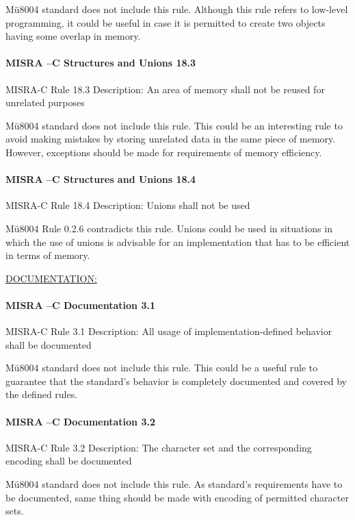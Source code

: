 Mü8004 standard does not include this rule. Although this rule refers to low-level programming, it could be useful in case it is permitted to create two objects having some overlap in memory.

\paragraph{MISRA –C Structures and Unions 18.3}
MISRA-C Rule 18.3 Description: An area of memory shall not be reused for unrelated purposes

Mü8004 standard does not include this rule. This could be an interesting rule to avoid making mistakes by storing unrelated data in the same piece of memory. However, exceptions should be made for requirements of memory efficiency.

\paragraph{MISRA –C Structures and Unions 18.4}
MISRA-C Rule 18.4 Description: Unions shall not be used

Mü8004 Rule 0.2.6 contradicts this rule. Unions could be used in situations in which the use of unions is advisable for an implementation that has to be efficient in terms of memory.


\begin{center}
\textsc{\underline{DOCUMENTATION:}}
\end{center}

\paragraph{MISRA –C Documentation 3.1}
MISRA-C Rule 3.1 Description: All usage of implementation-defined behavior shall be documented

Mü8004 standard does not include this rule. This could be a useful rule to guarantee that the standard’s behavior is completely documented and covered by the defined rules.

\paragraph{MISRA –C Documentation 3.2}
MISRA-C Rule 3.2 Description: The character set and the corresponding encoding shall be documented

Mü8004 standard does not include this rule. As standard’s requirements have to be documented, same thing should be made with encoding of permitted character sets.

